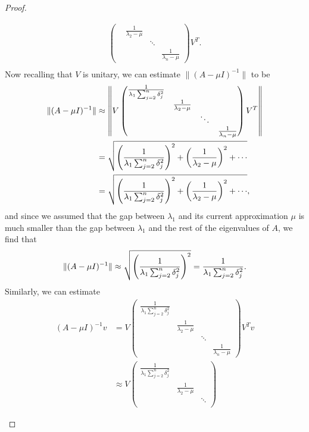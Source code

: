 \documentclass[12pt]{report}
\begin{document}
\begin{problem}
\begin{proof}
\begin{enumerate}
\begin{align*}
\begin{pmatrix}
            &\frac{1}{\lambda_2 - \mu}\\
            &&\ddots\\
            &&&\frac{1}{\lambda_n - \mu}
        \end{pmatrix}V^T.\\
    \end{align*} 
    Now recalling that $V$ is unitary, we can estimate $\|(A - \mu I)^{-1}\|$ to be
    \begin{align*}
        \|(A - \mu I)^{-1}\| &\approx \left\| V \begin{pmatrix}
            \frac{1}{\lambda_1 \sum_{j=2}^n \delta_j^2}\\
            &\frac{1}{\lambda_2 - \mu}\\
            &&\ddots\\
            &&&\frac{1}{\lambda_n - \mu}
        \end{pmatrix}V^T \right\|\\
        &= \sqrt{{\left(\frac{1}{\lambda_1 \sum_{j=2}^n \delta_j^2}\right)}^2 + {\left(\frac{1}{\lambda_2 - \mu}\right)}^2 + \cdots}\\
        &= \sqrt{{\left(\frac{1}{\lambda_1 \sum_{j=2}^n \delta_j^2}\right)}^2 + {\left(\frac{1}{\lambda_2 - \mu}\right)}^2 + \cdots},\\
    \end{align*}
    and since we assumed that the gap between $\lambda_1$ and its current approximation $\mu$ is much smaller than the gap between $\lambda_1$ and the rest of the eigenvalues of $A$, we find that 
    \[
        \|(A - \mu I)^{-1}\| \approx \sqrt{{\left(\frac{1}{\lambda_1 \sum_{j=2}^n \delta_j^2}\right)}^2} = \frac{1}{\lambda_1 \sum_{j=2}^n \delta_j^2}.
    \]
    Similarly, we can estimate
    \begin{align*}
        (A - \mu I)^{-1}v &= V \begin{pmatrix}
            \frac{1}{\lambda_1 \sum_{j=2}^n \delta_j^2}\\
            &\frac{1}{\lambda_2 - \mu}\\
            &&\ddots\\
            &&&\frac{1}{\lambda_n - \mu}
        \end{pmatrix}V^Tv\\
        &\approx V \begin{pmatrix}
            \frac{1}{\lambda_1 \sum_{j=2}^n \delta_j^2}\\
            &\frac{1}{\lambda_2 - \mu}\\
            &&\ddots\\

\end{pmatrix}
\end{align*}
\end{enumerate}
\end{proof}
\end{problem}
\end{document}
